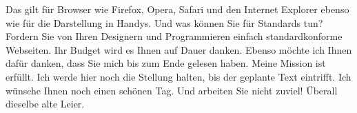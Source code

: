 \documentclass[ngerman, 11pt, a4paper]{article}
\begin{document}
Das gilt für Browser wie Firefox, Opera, Safari und den Internet Explorer ebenso wie für die Darstellung in Handys. Und was können Sie für Standards tun? Fordern Sie von Ihren Designern und Programmieren einfach standardkonforme Webseiten. Ihr Budget wird es Ihnen auf Dauer danken. Ebenso möchte ich Ihnen dafür danken, dass Sie mich bis zum Ende gelesen haben. Meine Mission ist erfüllt. Ich werde hier noch die Stellung halten, bis der geplante Text eintrifft. Ich wünsche Ihnen noch einen schönen Tag. Und arbeiten Sie nicht zuviel! Überall dieselbe alte Leier.

\pagebreak
{}
\setcounter{page}{3}

\setcounter{biburllcpenalty}{7000}
\setcounter{biburlucpenalty}{8000}

\printbibliography[title=Literaturverzeichnis, heading=bibintoc]
\end{document}
